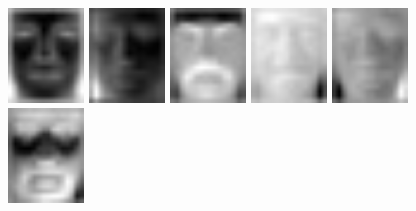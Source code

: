 ~\vfill

\begin{figure}[hbt]
  \centering
  \includegraphics[width=0.18\textwidth]{../results/L_rez/eigenfaces/largest1.jpg}
  \includegraphics[width=0.18\textwidth]{../results/L_rez/eigenfaces/largest2.jpg}
  \includegraphics[width=0.18\textwidth]{../results/L_rez/eigenfaces/largest3.jpg}
  \includegraphics[width=0.18\textwidth]{../results/L_rez/eigenfaces/largest4.jpg}
  \includegraphics[width=0.18\textwidth]{../results/L_rez/eigenfaces/largest5.jpg} \\
  \vspace{4pt}
  \includegraphics[width=0.18\textwidth]{../results/L_rez/eigenfaces/largest6.jpg}

\end{figure}
